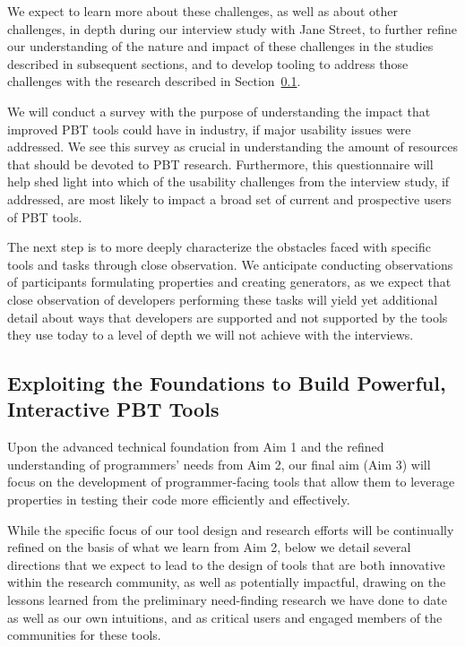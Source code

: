 We expect to learn more about these challenges, as well as about other challenges,
in depth during our interview study with Jane Street, to further refine our
understanding of the nature and impact of these challenges in the studies
described in subsequent sections, and to develop tooling to address
those challenges with the research described in Section~\ref{sec:tools}.


We will conduct a survey with the purpose of understanding the impact that
improved PBT tools could have in industry, if major usability issues were
addressed. We see this survey as crucial in understanding the amount of
resources that should be devoted to PBT research. Furthermore, this
questionnaire will help shed light into which of the usability challenges from
the interview study, if addressed, are most likely to impact a broad set of
current and prospective users of PBT tools.


The next step is to more deeply characterize the obstacles faced with specific
tools and tasks through close observation. We anticipate conducting observations
of participants formulating properties and creating generators, as we expect
that close observation of developers performing these tasks will yield yet
additional detail about ways that developers are supported and not supported by
the tools they use today to a level of depth we will not achieve with the
interviews.

\subsection{Exploiting the Foundations to Build Powerful, Interactive PBT Tools }
\label{sec:tools}

Upon the advanced technical foundation from Aim 1 and the refined understanding
of programmers' needs from Aim 2, our final aim (Aim 3) will focus on the
development of programmer-facing tools that allow them to leverage properties in
testing their code more efficiently and effectively.

While the specific focus of our tool design and research efforts will be
continually refined on the basis of what we learn from Aim 2, below we detail
several directions that we expect to lead to the design of tools that are both
innovative within the research community, as well as potentially impactful,
drawing on the lessons learned from the preliminary need-finding research we
have done to date as well as our own intuitions, and as critical users and
engaged members of the communities for these tools.

